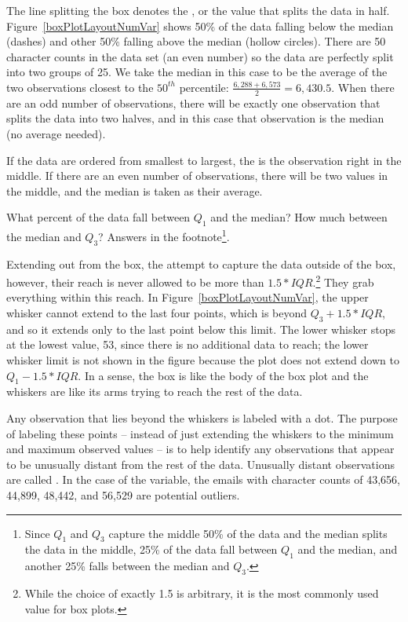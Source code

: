 The line splitting the box denotes the , or the value that splits the data in half. Figure~\ref{boxPlotLayoutNumVar} shows 50\% of the data falling below the median (dashes) and other 50\% falling above the median (hollow circles). There are 50 character counts in the data set (an even number) so the data are perfectly split into two groups of 25. We take the median in this case to be the average of the two observations closest to the $50^{th}$ percentile: $\frac{6,288 + 6,573}{2} = 6,430.5$. When there are an odd number of observations, there will be exactly one observation that splits the data into two halves, and in this case that observation is the median (no average needed).

\begin{termBox}{
If the data are ordered from smallest to largest, the  is the observation right in the middle. If there are an even number of observations, there will be two values in the middle, and the median is taken as their average.}
\end{termBox}

\begin{exercise}
What percent of the data fall between $Q_1$ and the median? How much between the median and $Q_3$? Answers in the footnote\footnote{Since $Q_1$ and $Q_3$ capture the middle 50\% of the data and the median splits the data in the middle, 25\% of the data fall between $Q_1$ and the median, and another 25\% falls between the median and $Q_3$.}.
\end{exercise}

Extending out from the box, the  attempt to capture the data outside of the box, however, their reach is never allowed to be more than $1.5*IQR$.\footnote{While the choice of exactly 1.5 is arbitrary, it is the most commonly used value for box plots.} They grab everything within this reach. In Figure~\ref{boxPlotLayoutNumVar}, the upper whisker cannot extend to the last four points, which is beyond $Q_3 + 1.5*IQR$, and so it extends only to the last point below this limit. The lower whisker stops at the lowest value, 53, since there is no additional data to reach; the lower whisker limit is not shown in the figure because the plot does not extend down to $Q_1 - 1.5*IQR$. In a sense, the box is like the body of the box plot and the whiskers are like its arms trying to reach the rest of the data.

Any observation that lies beyond the whiskers is labeled with a dot. The purpose of labeling these points -- instead of just extending the whiskers to the minimum and maximum observed values -- is to help identify any observations that appear to be unusually distant from the rest of the data. Unusually distant observations are called . In the case of the  variable, the emails with character counts of 43,656, 44,899, 48,442, and 56,529 are potential outliers.

